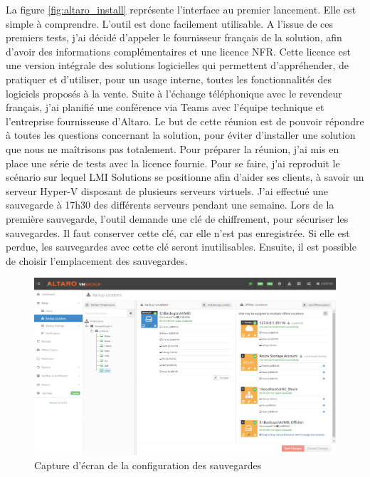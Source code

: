 \documentclass[pfe]{tnreport} %
\begin{document}
La figure \ref{fig:altaro_install} représente l'interface au premier lancement. Elle est simple à comprendre.\newline
L'outil est donc facilement utilisable. \newline
A l'issue de ces premiers tests, j'ai décidé d'appeler le fournisseur français de la solution, afin d'avoir des informations complémentaires et une licence NFR. Cette licence est une version intégrale des solutions logicielles qui permettent d’appréhender, de pratiquer et d’utiliser, pour un usage interne, toutes les fonctionnalités des logiciels proposés à la vente. \newline
Suite à l'échange téléphonique avec le revendeur français, j'ai planifié une conférence via Teams avec l'équipe technique et l'entreprise fournisseuse d'Altaro. \newline 
Le but de cette réunion est de pouvoir répondre à toutes les questions concernant la solution, pour éviter d'installer une solution que nous ne maîtrisons pas totalement. \newline
Pour préparer la réunion, j'ai mis en place une série de tests avec la licence fournie. \newline
Pour se faire, j'ai reproduit le scénario sur lequel LMI Solutions se positionne afin d'aider ses clients, à savoir un serveur Hyper-V disposant de plusieurs serveurs virtuels. \newline
J'ai effectué une sauvegarde à 17h30 des différents serveurs pendant une semaine. \newline
Lors de la première sauvegarde, l'outil demande une clé de chiffrement, pour sécuriser les sauvegardes. Il faut conserver cette clé, car elle n'est pas enregistrée. Si elle est perdue, les sauvegardes avec cette clé seront inutilisables. \newline
Ensuite, il est possible de choisir l'emplacement des sauvegardes.\newline
\begin{figure}[ht]
 \centering
 \includegraphics[width=15cm]{figures/backup-locations-big.png}
 \caption{Capture d'écran de la configuration des sauvegardes}
 \label{fig:altaro_back}
\end{figure}
\end{document}
